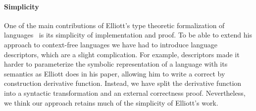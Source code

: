 \paragraph{Simplicity} One of the main contributions of Elliott's type theoretic formalization of languages~\cite{conal-languages} is its simplicity of implementation and proof. To be able to extend his approach to context-free languages we have had to introduce language descriptors, which are a slight complication. For example, descriptors made it harder to parameterize the symbolic representation of a language with its semantics as Elliott does in his paper, allowing him to write a correct by construction derivative function. Instead, we have split the derivative function into a syntactic transformation and an external correctness proof. Nevertheless, we think our approach retains much of the simplicity of Elliott's work.